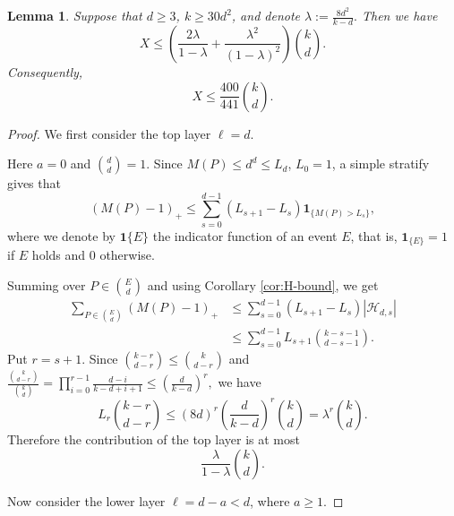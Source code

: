 \documentclass[10pt,a4paper]{amsart}
\newtheorem{lemma}{Lemma}
\begin{document}
	\begin{lemma}\label{lem:layer-cake}
		Suppose that $d\ge 3$, $k\ge 30d^2$, and denote
	$
		\lambda:=\frac{8d^2}{k-d}.
	$
		Then we have
		\[
		X
		\le
		\left(
		\frac{2\lambda}{1-\lambda}
		+
		\frac{\lambda^2}{(1-\lambda)^2}
		\right)
		\binom{k}{d}.
		\]
		Consequently,
		\[
		X\le \frac{400}{441}\binom{k}{d}.
		\]
	\end{lemma}

	\begin{proof}
		We first consider the top layer $\ell=d$. 

 Here $a=0$ and $\binom{d}{d}=1$.  Since $M(P)\le d^d\le L_d$, $L_0=1$, a simple stratify gives that
		\[
		(M(P)-1)_+
		\le
		\sum_{s=0}^{d-1}(L_{s+1}-L_s)\mathbf 1_{\{M(P)>L_s\}},
		\]
		where we denote by $\mathbf{1}\{E\}$ the indicator function of an event $E$,
		that is, $\mathbf{1}_{\{E\}} = 1$ if $E$ holds and $0$ otherwise.
		
		Summing over $P\in\binom{E}{d}$ and using Corollary \ref{cor:H-bound}, we get
		\[
		\begin{aligned}
			\sum_{P\in\binom{E}{d}}(M(P)-1)_+
			&\le
			\sum_{s=0}^{d-1}(L_{s+1}-L_s)|\mathcal H_{d,s}|  \\
			&\le
			\sum_{s=0}^{d-1}L_{s+1}\binom{k-s-1}{d-s-1}.
		\end{aligned}
		\]
		Put $r=s+1$.  Since
		$
		\binom{k-r}{d-r}\le \binom{k}{d-r}
		$
		and
		$
		\frac{\binom{k}{d-r}}{\binom{k}{d}}=\prod\limits_{i=0}^{r-1}\frac{d-i}{k-d+i+1}
		\le
		\left(\frac{d}{k-d}\right)^r,
		$
		we have
		\begin{equation}\label{eq:binom-estimate}
		L_r\binom{k-r}{d-r}
		\le
		(8d)^r\left(\frac{d}{k-d}\right)^r\binom{k}{d}
		=
		\lambda^r\binom{k}{d}.
		\end{equation}
		Therefore the contribution of the top layer is at most
		\begin{equation}\label{eq:top-layer}
			\frac{\lambda}{1-\lambda}\binom{k}{d}.
		\end{equation}
		
		Now consider the lower layer $\ell=d-a<d$, where $a\ge 1$.


\end{proof}
\end{document}
